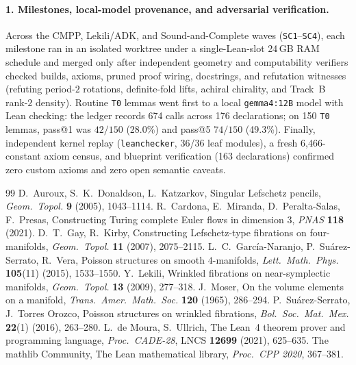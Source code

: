 \documentclass[10pt]{article}
\renewcommand{\_}{\origus\allowbreak}
\newcommand{\code}[1]{\texttt{#1}}
\newcommand{\NLeanDecls}{163}
\begin{document}
\paragraph{1. Milestones, local-model provenance, and adversarial verification.}
Across the CMPP, Lekili/ADK, and Sound-and-Complete waves (\code{SC1}--\code{SC4}), each milestone ran in an
isolated worktree under a single-Lean-slot 24\,GB RAM schedule and merged only after independent
geometry and computability verifiers checked builds, axioms, pruned proof wiring, docstrings, and
refutation witnesses (refuting period-$2$ rotations, definite-fold lifts, achiral chirality, and
Track~B rank-$2$ density). Routine \code{T0} lemmas went first to a local \code{gemma4:12B} model
with Lean checking: the ledger records 674 calls across 176 declarations; on 150 \code{T0} lemmas,
pass@1 was $42/150$ (28.0\%) and pass@5 $74/150$ (49.3\%). Finally, independent kernel replay
(\code{leanchecker}, 36/36 leaf modules), a fresh 6{,}466-constant axiom census, and blueprint
verification (\NLeanDecls{} declarations) confirmed zero custom axioms and zero open semantic caveats.

\begin{thebibliography}{99}\footnotesize\sloppy
\setlength{\itemsep}{0.8pt}
 D.~Auroux, S.~K.~Donaldson, L.~Katzarkov, Singular Lefschetz pencils,
  \emph{Geom.\ Topol.} \textbf{9} (2005), 1043--1114.
 R.~Cardona, E.~Miranda, D.~Peralta-Salas, F.~Presas, Constructing Turing complete
  Euler flows in dimension 3, \emph{PNAS} \textbf{118} (2021).
 D.~T.~Gay, R.~Kirby, Constructing Lefschetz-type fibrations on four-manifolds,
  \emph{Geom.\ Topol.} \textbf{11} (2007), 2075--2115.
 L.~C.~Garc\'ia-Naranjo, P.~Su\'arez-Serrato, R.~Vera, Poisson structures on smooth
  $4$-manifolds, \emph{Lett.\ Math.\ Phys.} \textbf{105}(11) (2015), 1533--1550.
 Y.~Lekili, Wrinkled fibrations on near-symplectic manifolds, \emph{Geom.\ Topol.}
  \textbf{13} (2009), 277--318.
 J.~Moser, On the volume elements on a manifold, \emph{Trans.\ Amer.\ Math.\ Soc.}
  \textbf{120} (1965), 286--294.
 P.~Su\'arez-Serrato, J.~Torres Orozco, Poisson structures on wrinkled fibrations,
  \emph{Bol.\ Soc.\ Mat.\ Mex.} \textbf{22}(1) (2016), 263--280.
 L.~de Moura, S.~Ullrich, The Lean~4 theorem prover and programming language,
  \emph{Proc.\ CADE-28}, LNCS \textbf{12699} (2021), 625--635.
 The mathlib Community, The Lean mathematical library, \emph{Proc.\ CPP 2020}, 367--381.
\end{thebibliography}
\end{document}
